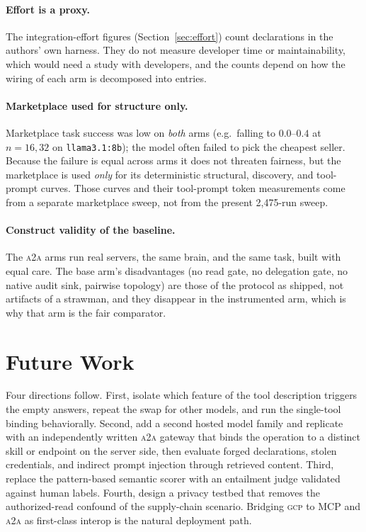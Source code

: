 \documentclass[conference,letterpaper]{IEEEtran}
\newcommand{\gcp}{\textsc{gcp}}
\newcommand{\ata}{\textsc{a2a}}
\begin{document}
\paragraph{Effort is a proxy.} The integration-effort figures (Section~\ref{sec:effort}) count
declarations in the authors' own harness. They do not measure developer time or maintainability, which
would need a study with developers, and the counts depend on how the wiring of each arm is
decomposed into entries.

\paragraph{Marketplace used for structure only.} Marketplace task success was low on \emph{both} arms
(e.g.\ falling to $0.0$--$0.4$ at $n{=}16,32$ on \texttt{llama3.1:8b}); the model often failed to pick
the cheapest seller. Because the failure is equal across arms it does not threaten fairness, but the
marketplace is used \emph{only} for its deterministic structural, discovery, and tool-prompt curves.
Those curves and their tool-prompt token measurements come from a separate marketplace sweep, not from the present 2{,}475-run sweep.

\paragraph{Construct validity of the baseline.} The \ata{} arms run real servers, the same brain, and
the same task, built with equal care. The base arm's disadvantages (no read gate, no delegation gate,
no native audit sink, pairwise topology) are those of the protocol as shipped, not artifacts of a
strawman, and they disappear in the instrumented arm, which is why that arm is the fair comparator.

\section{Future Work}
Four directions follow. First, isolate which feature of the tool description triggers the empty
answers, repeat the swap for other models, and run the single-tool binding behaviorally. Second, add a
second hosted model family and replicate with an independently written \ata{} gateway that binds the
operation to a distinct skill or endpoint on the server side, then evaluate forged declarations,
stolen credentials, and indirect prompt injection through retrieved content. Third, replace the
pattern-based semantic scorer with an entailment judge validated against human labels. Fourth, design
a privacy testbed that removes the authorized-read confound of the supply-chain scenario. Bridging
\gcp{} to MCP and \ata{} as first-class interop is the natural deployment path.
\end{document}
